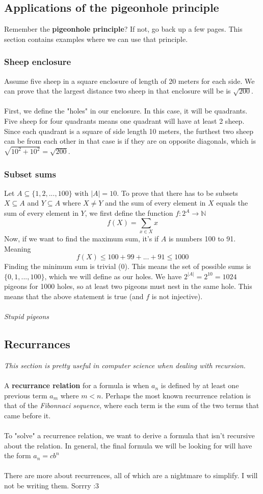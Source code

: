 \documentclass{article}
\begin{document}
\subsection{Applications of the pigeonhole principle}
Remember the \textbf{pigeonhole principle}? If not, go back up a few pages. This section contains examples where we can use that principle.
\subsubsection{Sheep enclosure}
Assume five sheep in a square enclosure of length of 20 meters for each side. We can prove that the largest distance two sheep in that enclosure will be is $\sqrt{200}$.
\\\\
First, we define the "holes" in our enclosure. In this case, it will be quadrants. Five sheep for four quadrants means one quadrant will have at least 2 sheep. Since each quadrant is a square of side length 10 meters, the furthest two sheep can be from each other in that case is if they are on opposite diagonals, which is $\sqrt{10^2 + 10^2} = \sqrt{200}$.
\subsubsection{Subset sums}
Let $A \subseteq \{1,2,...,100\} \text{ with }  |A| = 10$. To prove that there has to be subsets $X\subseteq A$ and $Y\subseteq A$ where $X\ne Y$ and the sum of every element in $X$ equals the sum of every element in $Y$, we first define the function $f:2^A \rightarrow \mathds{N}$
\[f(X)= \sum_{x\in X}x\]
Now, if we want to find the maximum sum, it's if $A$ is numbers 100 to 91. Meaning
\[f(X) \le 100+99+...+91 \le 1000\]
Finding the minimum sum is trivial (0). This means the set of possible sums is $\{0,1,...,100\}$, which we will define as our holes. We have $2^{|A|} = 2^{10} = 1024$ pigeons for 1000 holes, so at least two pigeons must nest in the same hole. This means that the above statement is true (and $f$ is not injective).
\\\\
\textit{Stupid pigeons}
\subsection{Recurrances}
\textit{This section is pretty useful in computer science when dealing with recursion.}
\\\\
A \textbf{recurrance relation} for a formula is when $a_n$ is defined by at least one previous term $a_m$ where $m<n$. Perhaps the most known recurrence relation is that of the \textit{Fibonnaci sequence}, where each term is the sum of the two terms that came before it.
\\\\
To "solve" a recurrence relation, we want to derive a formula that isn't recursive about the relation. In general, the final formula we will be looking for will have the form $a_n = cb^n$
\\\\
There are more about recurrences, all of which are a nightmare to simplify. I will not be writing them. Sorrry :3
\end{document}
